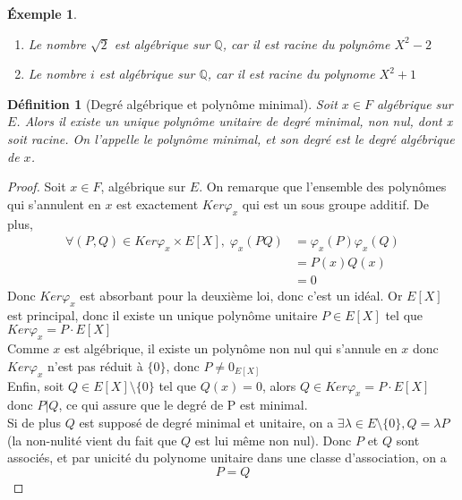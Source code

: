 \documentclass[a4paper,12pt,french]{report}
\newtheorem{definition}{Définition}[section]
\newtheorem{exemple}{Éxemple}[section]
\begin{document}
			\begin{exemple}
			$ $
			    \begin{enumerate} 
				    \item Le nombre \(\sqrt{2}\) est algébrique sur $\mathbb{Q}$, car il est racine du polynôme \(X^{2} - 2\)
				    \item Le nombre $i$ est algébrique sur $\mathbb{Q}$, car il est racine du polynome \(X^{2} +1\)
			    \end{enumerate}
			\end{exemple}
			\begin{definition}[Degré algébrique et polynôme minimal]
				Soit \(x \in F \) algébrique sur \(E\). Alors il existe un unique polynôme unitaire de degré minimal, non nul, dont x soit racine. On l'appelle le \emph{polynôme minimal}, et son degré est le \emph{degré algébrique} de \(x\).{}
			\end{definition}
				\begin{proof}
					Soit \(x \in F\), algébrique sur \(E\). On remarque que l'ensemble des polynômes qui s'annulent en \(x\) est exactement \(Ker \varphi_{x}\) qui est un sous groupe additif. De plus, 
					\[
						\begin{aligned}
							\forall (P,Q) \in Ker\varphi_{x} \times E[X], \; \varphi_{x}(PQ) &= \varphi_{x}(P)\varphi_{x}(Q) \\
											&=P(x)Q(x) \\
											&= 0
						\end{aligned}
					\]
					Donc \(Ker \varphi_{x}\) est absorbant pour la deuxième loi, donc c'est un idéal. Or \(E[X]\) est principal, donc il existe un unique polynôme unitaire \(P \in E[X]\) tel que \(Ker \varphi_{x} = P \cdot E[X]\)\\
					Comme \(x\) est algébrique, il existe un polynôme non nul qui s'annule en \(x\) donc \(Ker \varphi_{x}\) n'est pas réduit à \(\{0\}\), donc \(P \neq 0_{E[X]}\) \\
					Enfin, soit \(Q \in E[X]\setminus\{0\}\) tel que \( Q(x) = 0 \), alors \(Q \in Ker \varphi_{x} = P \cdot E[X] \) donc \(P | Q\), ce qui assure que le degré de P est minimal.\\
					Si de plus \(Q\) est supposé de degré minimal et unitaire, on a \(\exists \lambda \in E\setminus\{0\} , Q = \lambda P \) (la non-nulité vient du fait que \(Q\) est lui même non nul). Donc \(P\) et \(Q\) sont associés, et par unicité du polynome unitaire dans une classe d'association, on a \[P = Q\] 
				\end{proof}
			
\end{document}

